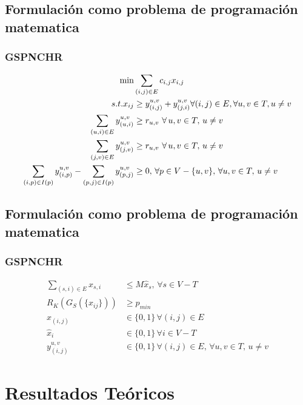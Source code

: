 \subsection{Formulación como problema de programación matematica}
\begin{frame}\frametitle{GSPNCHR}
\begin{align}
\min &\sum_{(i,j)\in E} c_{i,j}x_{i,j} \notag \\
s.t. x_{ij}&\geq y_{(i,j)}^{u,v}+y_{(j,i)}^{u,v} \forall (i,j)\in E,
\forall u,v\in T, u \neq v \\
\sum_{(u,i)\in E}y_{(u,i)}^{u,v} &\geq r_{u,v} \, \, \forall \, u,v\in T, \, u\neq v \\
\sum_{(j,v)\in E}y_{(j,v)}^{u,v} &\geq r_{u,v} \, \, \forall \, u,v\in T, \, u\neq v \\
\sum_{(i,p)\in I(p)}y_{(i,p)}^{u,v}  - \sum_{(p,j)\in I(p)}y_{(p,j)}^{u,v}&\geq 0, \, \forall p\in V-\{u,v\}, \, \forall u,v\in T, \, u \neq v \notag \\
\end{align}
\end{frame}

\subsection{Formulación como problema de programación matematica}
\begin{frame}\frametitle{GSPNCHR}
\begin{align}
\sum_{(s,i)\in E} x_{s,i} &\leq M \hat{x}_{s}, \, \forall s\in V-T \\
R_{K}(G_S(\{x_{ij}\})) &\geq p_{min} \\
x_{(i,j)} &\in \{0,1\} \, \forall (i,j)\in E \\
\hat{x}_{i} &\in \{0,1\} \, \forall i \in V-T  \\
 y_{(i,j)}^{u,v} &\in \{0,1\} \, \forall (i,j)\in E, \, \forall u,v \in T, \, u \neq v
\end{align}
\end{frame}

\section{Resultados Teóricos}
